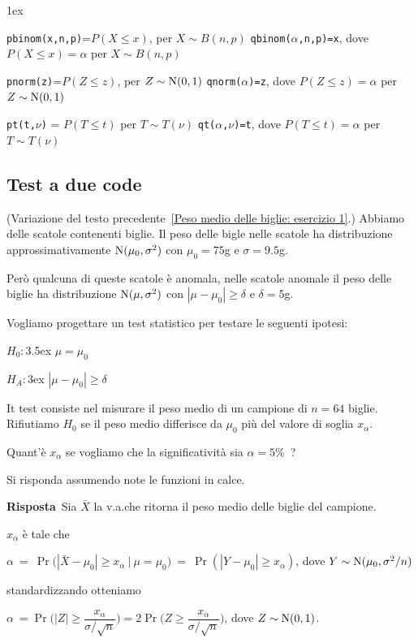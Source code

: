 \documentclass[11pt,openany]{book}
\begin{document}
\vfill
\parskip1ex
{\hrulefill\scriptsize

{\tt pbinom(x,n,p)}=$P(X\le x)$, per $X\sim B(n,p)$
\hfill 
{\tt qbinom($\alpha$,n,p)=x},  dove $P(X\le x)=\alpha$ per $X\sim B(n,p)$

{\tt pnorm(z)}=$P(Z\le z)$, per $Z\sim {\rm N}(0,1)$
\hfill 
{\tt qnorm($\alpha$)=z},  dove $P(Z\le z)=\alpha$ per $Z\sim {\rm N}(0,1)$

{\tt pt(t,$\nu$)} = $P(T\le t)$ per $T\sim T(\nu)$
\hfill
{\tt qt($\alpha$,$\nu$)=t}, dove $P(T\le t)=\alpha$ per $T\sim T(\nu)$

}

\clearpage\subsection{Test a due code}

(Variazione del testo precedente~\ref{Peso medio delle biglie: esercizio 1}.) 
Abbiamo delle scatole contenenti biglie.
Il peso delle bigle nelle scatole ha distribuzione approssimativamente  ${\rm N}(\mu_0,\sigma^2)$ con $\mu_0=75$g e $\sigma=9.5$g. 

Però qualcuna di queste scatole è anomala, nelle scatole anomale il peso delle biglie ha distribuzione  ${\rm N}(\mu,\sigma^2)$ con $|\mu-\mu_0|\ge\delta$ e $\delta=5$g.

Vogliamo progettare un test statistico per testare le seguenti ipotesi:

$H_0:$\kern3.5ex $\mu=\mu_0$

$H_A:$\kern3ex $|\mu-\mu_0|\ge\delta$

It test consiste nel misurare il peso medio di un campione di $n=64$ biglie.
Rifiutiamo $H_0$ se il peso medio differisce da $\mu_0$ più del valore di soglia $x_\alpha$.

Quant'è $x_\alpha$ se vogliamo che la significatività sia  $\alpha=5\%$~?

Si risponda assumendo note le funzioni in calce.

\textbf{Risposta}\  Sia $\bar X$ la v.a.\@ che ritorna il peso medio delle biglie del campione.

$x_\alpha$ è tale che \medskip

$\alpha\ =\ \Pr\big(|\bar X-\mu_0|\ge x_\alpha\ \mathbin\big|\ \mu=\mu_0\big)\ =\ \Pr(|Y-\mu_0|\ge x_\alpha)$, dove $Y\sim {\rm N}(\mu_0,\sigma^2/n)$ \medskip

standardizzando otteniamo \medskip

$\alpha\ =\Pr\bigg(|Z|\ge \dfrac{x_\alpha}{\sigma/\sqrt n}\bigg)=2\Pr\bigg(Z\ge \dfrac{x_\alpha}{\sigma/\sqrt n}\bigg)$, dove $Z\sim {\rm N}(0,1)$.
\end{document}
